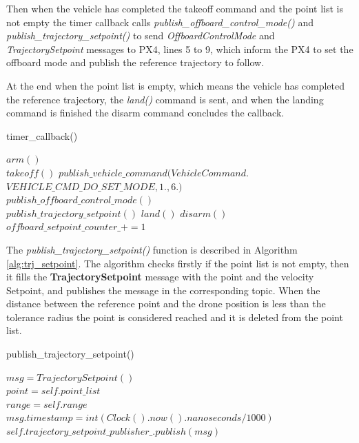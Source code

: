 \documentclass[journal]{IEEEtran}
\begin{document}
Then when the vehicle has completed the takeoff command and the point list is not empty the timer callback calls \textit{publish\_offboard\_control\_mode()} and \textit{publish\_trajectory\_setpoint()} to send \textit{OffboardControlMode} and \textit{TrajectorySetpoint} messages to PX4, lines 5 to 9, which inform the PX4 to set the offboard mode and publish the reference trajectory to follow.

At the end when the point list is empty, which means the vehicle has completed the reference trajectory, the \textit{land()} command is sent, and when the landing command is finished the disarm command concludes the callback. 

\begin{algorithm}[hbt!]

\caption{timer\_callback()}\label{alg:callback}
{
    $arm()$ \\
    $takeoff()$ 
}
{
    $publish\_vehicle\_command(VehicleCommand.$ 
    $VEHICLE\_CMD\_DO\_SET\_MODE, 1., 6.)$ \\
    $publish\_offboard\_control\_mode()$ \\
    $publish\_trajectory\_setpoint()$
}
{
    $land()$
}
{
    $disarm()$
}
$offboard\_setpoint\_counter\_ += 1$
\end{algorithm}

The \textit{publish\_trajectory\_setpoint()} function is described in Algorithm \ref{alg:trj_setpoint}. The algorithm checks firstly if the point list is not empty, then it fills the \textbf{TrajectorySetpoint} message with the point and the velocity Setpoint, and publishes the message in the corresponding topic. When the distance between the reference point and the drone position is less than the tolerance radius the point is considered reached and it is deleted from the point list.

\begin{algorithm}[hbt!]
\caption{publish\_trajectory\_setpoint()}\label{alg:trj_setpoint}
$msg = TrajectorySetpoint()$ \\
$point = self.point\_list$ \\
$range = self.range$  \\
$msg.timestamp = int(Clock().now().nanoseconds / 1000)$ \\
$self.trajectory\_setpoint\_publisher\_.publish(msg) $
\end{algorithm}
\end{document}
